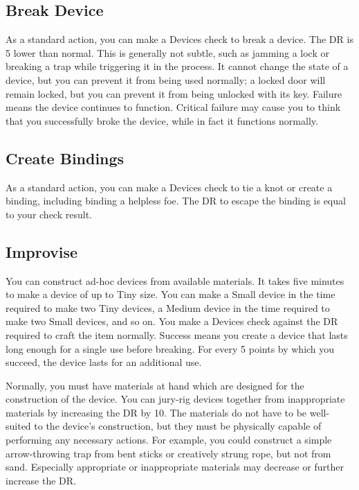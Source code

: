     \subsection{Break Device}
        As a standard action, you can make a Devices check to break a device. The DR is 5 lower than normal. This is generally not subtle, such as jamming a lock or breaking a trap while triggering it in the process. It cannot change the state of a device, but you can prevent it from being used normally; a locked door will remain locked, but you can prevent it from being unlocked with its key. Failure means the device continues to function. Critical failure may cause you to think that you successfully broke the device, while in fact it functions normally.

    \subsection{Create Bindings}
        As a standard action, you can make a Devices check to tie a knot or create a binding, including binding a helpless foe. The DR to escape the binding is equal to your check result.

    \subsection{Improvise}\label{Improvise}
        You can construct ad-hoc devices from available materials.
        It takes five minutes to make a device of up to Tiny size.
        You can make a Small device in the time required to make two Tiny devices, a Medium device in the time required to make two Small devices, and so on.
        You make a Devices check against the DR required to craft the item normally.
        Success means you create a device that lasts long enough for a single use before breaking.
        For every 5 points by which you succeed, the device lasts for an additional use.

        Normally, you must have materials at hand which are designed for the construction of the device.
        You can jury-rig devices together from inappropriate materials by increasing the DR by 10.
        The materials do not have to be well-suited to the device's construction, but they must be physically capable of performing any necessary actions.
        For example, you could construct a simple arrow-throwing trap from bent sticks or creatively strung rope, but not from sand.
        Especially appropriate or inappropriate materials may decrease or further increase the DR.\

